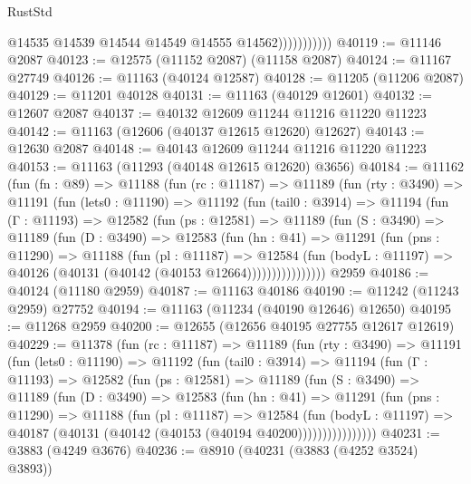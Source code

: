 \begin{lexlean}{RustStd}
\begin{coremodule}
                          @14535
                          @14539
                          @14544
                          @14549
                          @14555
                          @14562)))))))))))
@40119 := @11146 @2087
@40123 := @12575 (@11152 @2087) (@11158 @2087)
@40124 := @11167 @27749
@40126 := @11163 (@40124 @12587)
@40128 := @11205 (@11206 @2087)
@40129 := @11201 @40128
@40131 := @11163 (@40129 @12601)
@40132 := @12607 @2087
@40137 := @40132 @12609 @11244 @11216 @11220 @11223
@40142 := @11163 (@12606 (@40137 @12615 @12620) @12627)
@40143 := @12630 @2087
@40148 := @40143 @12609 @11244 @11216 @11220 @11223
@40153 := @11163 (@11293 (@40148 @12615 @12620) @3656)
@40184 := @11162
    (fun (fn : @89) =>
    @11188
      (fun (rc : @11187) =>
      @11189
        (fun (rty : @3490) =>
        @11191
          (fun (lets0 : @11190) =>
          @11192
            (fun (tail0 : @3914) =>
            @11194
              (fun (Γ : @11193) =>
              @12582
                (fun (ps : @12581) =>
                @11189
                  (fun (S : @3490) =>
                  @11189
                    (fun (D : @3490) =>
                    @12583
                      (fun (hn : @41) =>
                      @11291
                        (fun (pns : @11290) =>
                        @11188
                          (fun (pl : @11187) =>
                          @12584
                            (fun (bodyL : @11197) =>
                            @40126 (@40131 (@40142 (@40153 @12664))))))))))))))))
    @2959
@40186 := @40124 (@11180 @2959)
@40187 := @11163 @40186
@40190 := @11242 (@11243 @2959) @27752
@40194 := @11163 (@11234 (@40190 @12646) @12650)
@40195 := @11268 @2959
@40200 := @12655 (@12656 @40195 @27755 @12617 @12619)
@40229 := @11378
    (fun (rc : @11187) =>
    @11189
      (fun (rty : @3490) =>
      @11191
        (fun (lets0 : @11190) =>
        @11192
          (fun (tail0 : @3914) =>
          @11194
            (fun (Γ : @11193) =>
            @12582
              (fun (ps : @12581) =>
              @11189
                (fun (S : @3490) =>
                @11189
                  (fun (D : @3490) =>
                  @12583
                    (fun (hn : @41) =>
                    @11291
                      (fun (pns : @11290) =>
                      @11188
                        (fun (pl : @11187) =>
                        @12584
                          (fun (bodyL : @11197) =>
                          @40187 (@40131 (@40142 (@40153 (@40194 @40200))))))))))))))))
@40231 := @3883 (@4249 @3676)
@40236 := @8910 (@40231 (@3883 (@4252 @3524) @3893))

\end{coremodule}
\end{lexlean}
